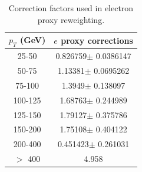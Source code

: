\begin{table}[htdp]
	\centering
  \begin{tabular}{|c|c|}
  \hline
  $p_T$ (GeV)  & $e$ proxy corrections \\ \hline
  25-50  & 0.826759$\pm$ 0.0386147  \\ \hline
  50-75  & 1.13381$\pm$ 0.0695262  \\ \hline
  75-100  & 1.3949$\pm$ 0.138097  \\ \hline
  100-125  & 1.68763$\pm$ 0.244989  \\ \hline
  125-150  & 1.79127$\pm$ 0.375786  \\ \hline
  150-200  & 1.75108$\pm$ 0.404122  \\ \hline
  200-400  & 0.451423$\pm$ 0.261031  \\ \hline
  $>$ 400 & 4.958 \\ \hline
  \end{tabular}
  \caption{Correction factors used in electron proxy reweighting.}
  \label{table:correctionsfakelep}
\end{table}
